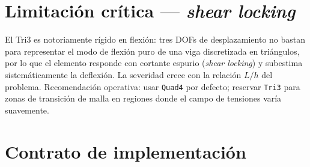 \documentclass[11pt,letterpaper,oneside]{report}
\begin{document}
\section{Limitación crítica --- \textit{shear locking}}

El Tri3 es notoriamente rígido en flexión: tres DOFs de desplazamiento no bastan para representar el modo de flexión puro de una viga discretizada en triángulos, por lo que el elemento responde con cortante espurio (\textit{shear locking}) y subestima sistemáticamente la deflexión. La severidad crece con la relación $L/h$ del problema. Recomendación operativa: usar \texttt{Quad4} por defecto; reservar \texttt{Tri3} para zonas de transición de malla en regiones donde el campo de tensiones varía suavemente.


\section{Contrato de implementación}
\end{document}
